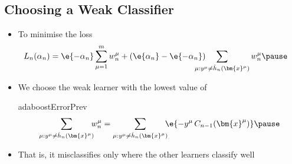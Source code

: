 \begin{slide}
\section[-2]{Choosing a Weak Classifier}

\begin{PauseHighLight}
  \begin{itemize}
  \item To minimise the loss
    \begin{align*}
       L_n(\alpha_n)  &= \e{-\alpha_n} \sum_{\mu=1}^m w_n^\mu +
        (\e{\alpha_n}-\e{-\alpha_n})\hspace{-1.5em} 
        \sum_{\mu:y^\mu\neq \hat{h}_n(\bm{x}^\mu)} w_n^\mu\pause
    \end{align*}
  \item We choose the weak learner with the lowest value of
    \begin{rightImage}{adaboostErrorPrev}
      \begin{align*}
        \sum_{\mu:y^\mu\neq \hat{h}_n(\bm{x}^\mu)}\!\!\! w_n^\mu
        =  \sum_{\mu:y^\mu\neq \hat{h}_n(\bm{x}^\mu)} \!\!\! \e{-y^\mu\,C_{n-1}(\bm{x}^\mu)}
        \pause
      \end{align*}  
    \end{rightImage}
  \item That is, it misclassifies only where the other learners classify
    well\pause 
  \end{itemize}
\end{PauseHighLight}

\end{slide}


